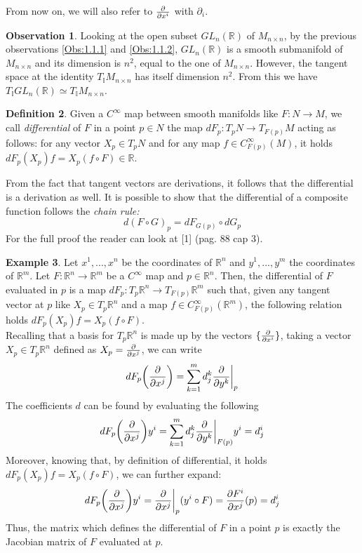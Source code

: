 \documentclass[12pt,a4paper]{report}
\theoremstyle{definition}
\newtheorem{Def}{Definition}[chapter]
\theoremstyle{Theorem}
\theoremstyle{definition}
\newtheorem{Ex}[Def]{Example}
\theoremstyle{definition}
\newtheorem{Obs}[Def]{Observation}
\begin{document}
	From now on, we will also refer to $\partial\over \partial x^i$ with $\partial_i$.
	\begin{Obs} \label{Obs 1.1.3}
		Looking at the open subset $GL_n(\mathbb{R})$ of $M_{n\times n}$, by the previous observations \ref{Obs:1.1.1} and \ref{Obs:1.1.2}, $GL_n(\mathbb{R})$ is a smooth submanifold of $M_{n\times n}$ and its dimension is $n^2$, equal to the one of $M_{n\times n}$. However, the tangent space at the identity $T_\mathbb{I}M_{n\times n}$ has itself dimension $n^2$. From this we have $T_\mathbb{I}GL_n(\mathbb{R})\simeq T_\mathbb{I}M_{n\times n}$.
	\end{Obs}
	\begin{Def}
		Given a $C^\infty$ map between smooth manifolds like $F:N\rightarrow M$, we call \textit{differential} of $F$ in a point $p\in N$ the map $dF_p:T_pN\rightarrow T_{F(p)}M$ acting as follows: for any vector $X_p\in T_pN$ and for any map $f\in C_{F(p)}^\infty(M)$, it holds $dF_p(X_p)f=X_p(f\circ F)\in\mathbb{R}$.
	\end{Def}
	From the fact that tangent vectors are derivations, it follows that the differential is a derivation as well. It is possible to show that the differential of a composite function follows the \textit{chain rule:} 
	$$d(F\circ G)_p=dF_{G(p)}\circ dG_p$$ 
	For the full proof the reader can look at [1] (pag. 88 cap 3).
	\begin{Ex}
		Let $x^1,...,x^n$ be the coordinates of $\mathbb{R}^n$ and $y^1,...,y^m$ the coordinates of $\mathbb{R}^m$. Let $F:\mathbb{R}^n\rightarrow \mathbb{R}^m$ be a $C^\infty$ map and $p\in \mathbb{R}^n$. Then, the differential of $F$ evaluated in $p$ is a map $dF_p:T_p\mathbb{R}^n\rightarrow T_{F(p)}\mathbb{R}^m$ such that, given any tangent vector at $p$ like $X_p\in T_p\mathbb{R}^n$ and a map $f\in C_{F(p)}^\infty(\mathbb{R}^m)$, the following relation holds $dF_p(X_p)f=X_p(f\circ F)$.\\
		Recalling that a basis for $T_p\mathbb{R}^n$ is made up by the vectors $\{{\partial\over\partial x^i}\}$, taking a vector $X_p\in T_p\mathbb{R}^n$ defined as $X_p={\partial\over \partial x^j}$, we can write $$dF_p\bigg{(}{\partial\over \partial x^j}\bigg{)}=\sum_{k=1}^{m}d_j^k{\partial\over \partial y^k}\bigg{\rvert}_p$$
		The coefficients $d$ can be found by evaluating the following 
		$$dF_p\bigg{(}{\partial\over \partial x^j}\bigg{)}y^i=\sum_{k=1}^{m}d_j^k{\partial\over \partial y^k}\bigg{\rvert}_{F(p)}y^i=d_j^i$$
		Moreover, knowing that, by definition of differential, it holds $dF_p(X_p)f=X_p(f\circ F)$, we can further expand:
		$$dF_p\bigg{(}{\partial\over \partial x^j}\bigg{)}y^i={\partial\over \partial x^j}\bigg{\rvert}_p(y^i\circ F)={\partial F^i\over \partial x^j}(p)=d^i_j$$
		Thus, the matrix which defines the differential of $F$ in a point $p$ is exactly the Jacobian matrix of $F$ evaluated at $p$.
	\end{Ex}
\end{document}

